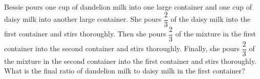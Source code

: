 Bessie pours one cup of dandelion milk into one large container and one cup of daisy milk into another large container. She pours $\dfrac23$ of the daisy milk into the first container and stirs thoroughly. Then she pours $\dfrac23$ of the mixture in the first container into the second container and stirs thoroughly. Finally, she pours $\dfrac23$ of the mixture in the second container into the first container and stirs thoroughly. What is the final ratio of dandelion milk to daisy milk in the first container?

